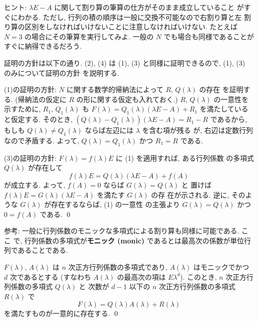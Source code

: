 \documentclass[12pt,twoside]{jarticle}
\begin{document}
\noindent
ヒント: $\lambda E - A$ に関して割り算の筆算の仕方がそのまま成立していること 
がすぐにわかる.  ただし, 行列の積の順序は一般に交換不可能なので右割り算と左
割り算の区別をしなければいけないことに注意しなければいけない.
たとえば $N=3$ の場合にその筆算を実行してみよ.  
一般の $N$ でも場合も同様であることがすぐに納得できるだろう.

証明の方針は以下の通り. 
(2), (4) は (1), (3) と同様に証明できるので, (1), (3) のみについて証明の方針
を説明する.

(1)の証明の方針: $N$ に関する数学的帰納法によって $R$, $Q(\lambda)$ の存在
を証明する.  (帰納法の仮定に $R$ の形に関する仮定も入れておく.)
$R$, $Q(\lambda)$ の一意性を示すために, $R_1$, $Q_1(\lambda)$ 
も $F(\lambda) = Q_1(\lambda)(\lambda E - A) + R_1$ を満たしていると仮定する.  
そのとき, $(Q(\lambda) - Q_1(\lambda))(\lambda E - A) = R_1 - R$ であるから, 
もしも $Q(\lambda) \ne Q_1(\lambda)$ ならば左辺には $\lambda$ を含む項が残る
が, 右辺は定数行列なので矛盾する. 
よって, $Q(\lambda) = Q_1(\lambda)$ かつ $R_1 = R$ である. 

(3)の証明の方針: $F(\lambda)=f(\lambda)E$ に (1) を適用すれば, ある行列係数
の多項式 $Q(\lambda)$ が存在して
\begin{equation*}
  f(\lambda)E = Q(\lambda)(\lambda E - A) + f(A)
\end{equation*}
が成立する.  よって, $f(A)=0$ ならば $G(\lambda)=Q(\lambda)$ と
置けば $f(\lambda)E = G(\lambda)(\lambda E - A)$ を満たす $G(\lambda)$ の存
在が示される.  逆に, そのような $G(\lambda)$ が存在するならば, (1) の一意性
の主張より $G(\lambda)=Q(\lambda)$ かつ $0 = f(A)$ である. 
\qed


\medskip
\noindent
参考: 一般に行列係数のモニックな多項式による割り算も同様に可能である.  ここ
で, 行列係数の多項式が{\bf モニック (monic)} であるとは最高次の係数が単位行
列であることである.

\begin{question}[15点]
  $F(\lambda)$, $A(\lambda)$ は $n$ 次正方行列係数の多項式であり, 
  $A(\lambda)$ はモニックでかつ $d$ 次であるとする
  (すなわち $A(\lambda)$ の最高次の項は $E \lambda^d$). 
  このとき, $n$ 次正方行列係数の多項式 $Q(\lambda)$ と
  次数が $d-1$ 以下の $n$ 次正方行列係数の多項式 $R(\lambda)$ で
  \begin{equation*}
    F(\lambda) = Q(\lambda)A(\lambda) + R(\lambda)
  \end{equation*}
  を満たすものが一意的に存在する. \qed
\end{question}
\end{document}
